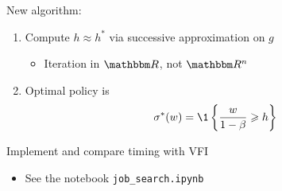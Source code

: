 \begin{frame}
    
    New algorithm:

    \begin{enumerate}
        \item Compute $h \approx h^*$ via successive approximation on $g$
            \vspace{1em}
            \begin{itemize}
                \item Iteration in $\RR$, not $\RR^n$
            \end{itemize}
            \vspace{1em}
        \item Optimal policy is 
            \begin{equation*}
                \sigma^*(w)
                = \1
                \left\{
                    \frac{w}{1-\beta}
                    \geq
                    h
                \right\}
            \end{equation*}
    \end{enumerate}


            \vspace{1em}
            \vspace{1em}
    \Ex Implement and compare timing with VFI
            \vspace{1em}


    \begin{itemize}
        \item See the notebook \texttt{job\_search.ipynb}
    \end{itemize}

\end{frame}















